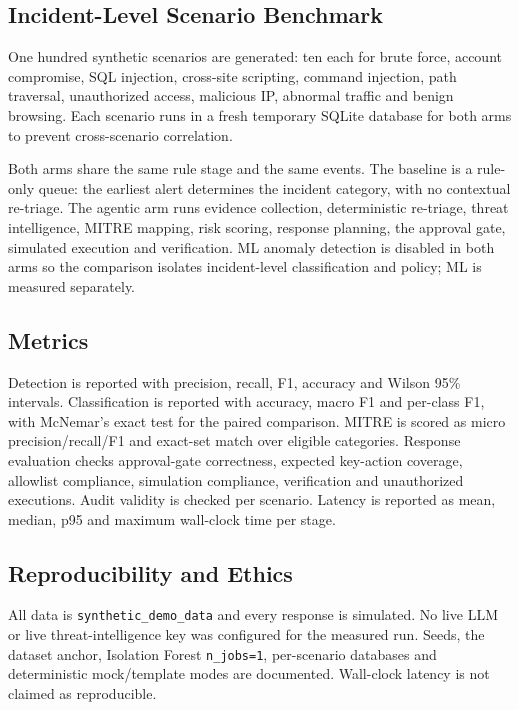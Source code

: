 \documentclass[10pt,twocolumn]{article}
\begin{document}
\subsection{Incident-Level Scenario Benchmark}

One hundred synthetic scenarios are generated: ten each for brute force, account compromise, SQL injection, cross-site scripting, command injection, path traversal, unauthorized access, malicious IP, abnormal traffic and benign browsing. Each scenario runs in a fresh temporary SQLite database for both arms to prevent cross-scenario correlation.

Both arms share the same rule stage and the same events. The baseline is a rule-only queue: the earliest alert determines the incident category, with no contextual re-triage. The agentic arm runs evidence collection, deterministic re-triage, threat intelligence, MITRE mapping, risk scoring, response planning, the approval gate, simulated execution and verification. ML anomaly detection is disabled in both arms so the comparison isolates incident-level classification and policy; ML is measured separately.

\subsection{Metrics}

Detection is reported with precision, recall, F1, accuracy and Wilson 95\% intervals. Classification is reported with accuracy, macro F1 and per-class F1, with McNemar's exact test for the paired comparison. MITRE is scored as micro precision/recall/F1 and exact-set match over eligible categories. Response evaluation checks approval-gate correctness, expected key-action coverage, allowlist compliance, simulation compliance, verification and unauthorized executions. Audit validity is checked per scenario. Latency is reported as mean, median, p95 and maximum wall-clock time per stage.

\subsection{Reproducibility and Ethics}

All data is \texttt{synthetic\_demo\_data} and every response is simulated. No live LLM or live threat-intelligence key was configured for the measured run. Seeds, the dataset anchor, Isolation Forest \texttt{n\_jobs=1}, per-scenario databases and deterministic mock/template modes are documented. Wall-clock latency is not claimed as reproducible.
\end{document}
